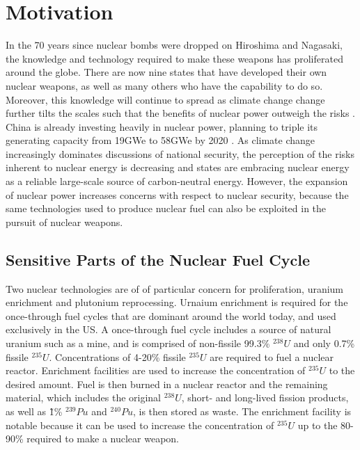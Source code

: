 \section{Motivation}
\label{s_motive}

In the 70 years since nuclear bombs were dropped on Hiroshima and Nagasaki, the knowledge and technology required to make these weapons has proliferated around the globe. There are now nine states that have developed their own nuclear weapons, as well as many others who have the capability to do so\cite{feiveson_unmaking_2014}.  Moreover, this knowledge will continue to spread as climate change change further tilts the scales such that the benefits of nuclear power outweigh the risks \cite{mooney_why_2014}.  China is already investing heavily in nuclear power, planning to triple its generating capacity from 19GWe to 58GWe by 2020  \cite{world_nuclear_news_china_2014}.  As climate change increasingly dominates discussions of national security, the perception of the risks inherent to nuclear energy is decreasing and states are embracing nuclear energy as a reliable large-scale source of carbon-neutral energy.  However, the expansion of nuclear power increases concerns with respect to nuclear security, because the same technologies used to produce nuclear fuel can also be exploited in the pursuit of nuclear weapons.


\subsection{Sensitive Parts of the Nuclear Fuel Cycle}

Two nuclear technologies are of of particular concern for proliferation, uranium enrichment and plutonium reprocessing.  Urnaium enrichment is required for the once-through fuel cycles that are dominant around the world today, and used exclusively in the US.  A once-through fuel cycle includes a source of natural uranium such as a mine, and is comprised of non-fissile 99.3\% $^{238}U$ and only 0.7\% fissile $^{235}U$. Concentrations of 4-20\% fissile $^{235}U$ are required to fuel a nuclear reactor. Enrichment facilities are used to increase the concentration of $^{235}U$ to the desired amount.  Fuel is then burned in a nuclear reactor and the remaining material, which includes the original $^{238}U$, short- and long-lived fission products, as well as \~1\% $^{239}Pu$ and $^{240}Pu$, is then stored as waste.  The enrichment facility is notable because it can be used to increase the concentration of $^{235}U$ up to the 80-90\% required to make a nuclear weapon\cite{_military_2014}.

